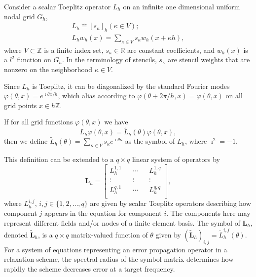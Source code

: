\documentclass[review]{siamart190516}
\begin{document}

Consider a scalar Toeplitz operator $L_h$ on an infinite one dimensional uniform nodal grid $G_h$,
\begin{equation}
\begin{split}
L_h \mathrel{\hat{=}} \left[ s_\kappa \right]_h \left( \kappa \in V \right);\\
L_h w_h \left( x \right) = \sum_{\kappa \in V} s_\kappa w_h \left( x + \kappa h \right),
\end{split}
\end{equation}
where $V \subset \mathbb{Z}$ is a finite index set, $s_\kappa \in \mathbb{R}$ are constant coefficients, and $w_h \left( x \right)$ is a $l^2$ function on $G_h$. In the terminology of stencils, $s_{\kappa}$ are stencil weights that are nonzero on the neighborhood $\kappa \in V$.

Since $L_h$ is Toeplitz, it can be diagonalized by the standard Fourier modes $\varphi \left( \theta, x \right) = e^{\imath \theta x / h}$, which alias according to $\varphi(\theta+ 2\pi/h, x) = \varphi(\theta, x)$ on all grid points $x \in h \mathbb Z$.

\begin{definition}[Symbol of $L_h$]\label{def:symbol}
If for all grid functions $\varphi \left( \theta, x \right)$ we have
\begin{equation}
L_h \varphi \left( \theta, x \right) = \tilde{L}_h \left( \theta \right) \varphi \left( \theta, x \right),
\end{equation}
then we define $\tilde{L}_h \left( \theta \right) = \sum_{\kappa \in V} s_\kappa e^{\imath \theta \kappa}$ as the symbol of $L_h$, where $\imath^2 = -1$.
\end{definition}

This definition can be extended to a $q \times q$ linear system of operators by
\begin{equation}
\mathbf{L}_h =
\begin{bmatrix}
    L_h^{1, 1} && \cdots && L_h^{1, q}        \\
    \vdots               && \vdots && \vdots  \\
    L_h^{q, 1} && \cdots && L_h^{q, q}        \\
\end{bmatrix},
\end{equation}
where $L_h^{i, j}$, $i, j \in \lbrace 1, 2, \dots, q \rbrace$ are given by scalar Toeplitz operators describing how component $j$ appears in the equation for component $i$.
The components here may represent different fields and/or nodes of a finite element basis.
The symbol of $\mathbf{L}_h$, denoted $\tilde{\mathbf{L}}_h$, is a $q \times q$ matrix-valued function of $\theta$ given by $\left( \tilde{\mathbf{L}}_h \right)_{i, j} = \tilde{L}_h^{i, j} \left( \theta \right)$.
For a system of equations representing an error propagation operator in a relaxation scheme, the spectral radius of the symbol matrix determines how rapidly the scheme decreases error at a target frequency.
\end{document}
